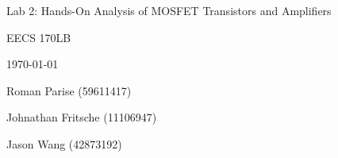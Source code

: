 \centering
\vspace{2.5cm}
{\huge Lab 2: Hands-On Analysis of MOSFET Transistors and Amplifiers \par}
{\Large EECS 170LB \par}
{\Large \today \par}
{\large Roman Parise (59611417) \par}
{\large Johnathan Fritsche (11106947) \par}
{\large Jason Wang (42873192) \par}
\vspace{1cm}
\vspace{1cm}
